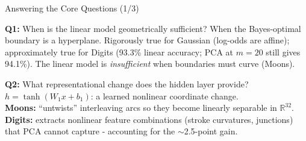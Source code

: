 \documentclass[11pt,aspectratio=169]{beamer}
\begin{document}
\begin{frame}{Answering the Core Questions (1/3)}

\begin{block}{\textbf{Q1:} When is the linear model geometrically sufficient?}
When the Bayes-optimal boundary is a hyperplane.  Rigorously true for Gaussian (log-odds are affine); approximately true for Digits (93.3\% linear accuracy; PCA at $m{=}20$ still gives 94.1\%).
The linear model is \textit{insufficient} when boundaries must curve (Moons).
\end{block}

\vspace{0.8em}

\begin{block}{\textbf{Q2:} What representational change does the hidden layer provide?}
$h = \tanh(W_1 x + b_1)$: a learned nonlinear coordinate change.\\
\textbf{Moons:} ``untwists'' interleaving arcs so they become linearly separable in $\mathbb{R}^{32}$.\\
\textbf{Digits:} extracts nonlinear feature combinations (stroke curvatures, junctions) that PCA cannot capture - accounting for the $\sim$2.5-point gain.
\end{block}

\end{frame}
\end{document}
